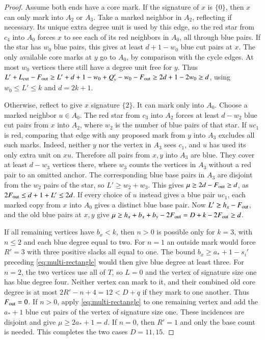 \documentclass[preprint,11pt,numbers]{elsarticle-arxiv}
\numberwithin{equation}{section}
\theoremstyle{definition}
\begin{document}
\begin{proof}
Assume both ends have a core mark. If the signature of $x$
is $\{0\}$, then $x$ can only mark into $A_2$ or $A_3$.
Take a marked neighbor in $A_2$, reflecting if necessary.
Its unique extra degree unit is used by this edge, so the
red star from $c_4$ into $A_0$ forces $x$ to see each of its
red neighbors in $A_0$, all through blue pairs. If the star
has $w_0$ blue pairs, this gives at least $d+1-w_0$ blue cut
pairs at $x$. The only available core marks at $y$ go to
$A_0$, by comparison with the cycle edges. At most $w_0$
vertices there still have a degree unit free for $y$. Thus
$L'+L_{\rm cut}-F_{\rm out}\ge L'+d+1-w_0+Q_y'-w_0-F_{\rm out}\ge2d+1-2w_0\ge d$,
using $w_0\le L'\le k$ and $d=2k+1$.

Otherwise, reflect to give $x$ signature $\{2\}$. It can
mark only into $A_0$. Choose a marked neighbor $u\in A_0$.
The red star from $c_3$ into $A_2$ forces at least $d-w_2$
blue cut pairs from $x$ into $A_2$, where $w_2$ is the
number of blue pairs of that star. If $uc_1$ is red, comparing
that edge with any proposed mark from $y$ into $A_3$ excludes
all such marks. Indeed, neither $y$ nor the vertex in $A_3$
sees $c_1$, and $u$ has used its only extra unit on $xu$.
Therefore all pairs from $x,y$ into $A_3$ are blue. They
cover at least $d-w_3$ vertices there, where $w_3$ counts the
vertices in $A_3$ without a red pair to an omitted anchor.
The corresponding blue base pairs in $A_3$ are disjoint
from the $w_2$ pairs of the star, so $L'\ge w_2+w_3$.
This gives $\mu\ge 2d-F_{\rm out}\ge d$, as $2F_{\rm out}\le d+1+L'\le2d$.
If every choice of $u$ instead gives a blue pair $uc_1$,
each marked copy from $x$ into $A_0$ gives a distinct
blue base pair. Now $L'\ge h_x-F_{\rm out}$, and the old blue pairs
at $x,y$ give $\mu\ge h_x+b_x+b_y-2F_{\rm out}=D+k-2F_{\rm out}\ge d$.

If all remaining vertices have $b_x<k$, then $n>0$ is possible
only for $k=3$, with $n\le2$ and each blue degree equal to two.
For $n=1$ an outside mark would force $R'=3$ with three
positive slacks all equal to one. The bound
$b_x\ge a_*+1-s_i'$ preceding \eqref{eq:multi-rectangle}
would then give blue degree at least three. For $n=2$, the
two vertices use all of $T$, so $L=0$ and the vertex of
signature size one has blue degree four. Neither vertex can
mark to it, and their combined old core degree is at most
$2R'-n+4=12<D+q$ if they mark to one another. Thus $F_{\rm out}=0$.
If $n>0$, apply \eqref{eq:multi-rectangle} to one remaining
vertex and add the $a_*+1$ blue cut pairs of the vertex of
signature size one. These incidences are disjoint and give
$\mu\ge2a_*+1=d$. If $n=0$, then $R'=1$ and only the base
count is needed. This completes the two cases $D=11,15$.


\end{proof}
\end{document}
